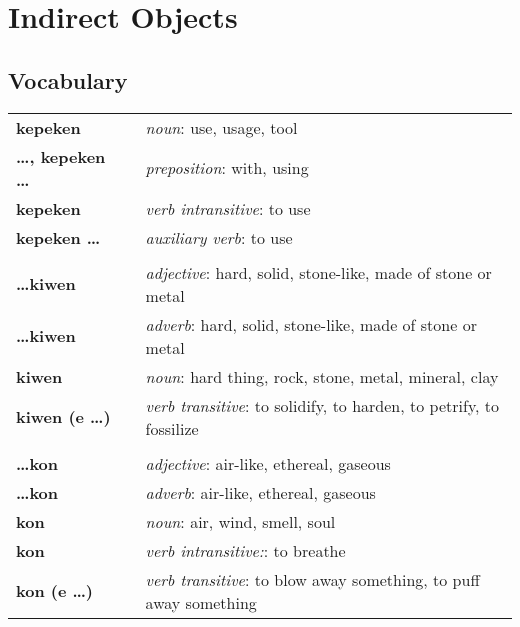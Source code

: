 \section{Indirect Objects}
%
\subsection*{Vocabulary}
\begin{supertabular}{p{2,5cm}|ll}
%
\textbf{kepeken} && \textit{noun}: use, usage, tool \\ %
\textbf{\dots , kepeken \dots} && \textit{preposition}: with, using \\ %
\textbf{kepeken} && \textit{verb intransitive}: to use \\ %
\textbf{kepeken \dots} && \textit{auxiliary verb}: to use \\ %
 && \\ %
%
\textbf{\dots kiwen} && \textit{adjective}: hard, solid, stone-like, made of stone or metal \\ %
\textbf{\dots kiwen} && \textit{adverb}: hard, solid, stone-like, made of stone or metal \\ %
\textbf{kiwen} && \textit{noun}: hard thing, rock, stone, metal, mineral, clay \\ %
\textbf{kiwen (e \dots)} && \textit{verb transitive}: to solidify, to harden, to petrify, to fossilize \\ %
 && \\ %
%
\textbf{\dots kon} && \textit{adjective}: air-like, ethereal, gaseous \\ %
\textbf{\dots kon} && \textit{adverb}: air-like, ethereal, gaseous \\ %
\textbf{kon} && \textit{noun}: air, wind, smell, soul \\ %
\textbf{kon} && \textit{verb intransitive:}: to breathe \\ %
\textbf{kon (e \dots)} && \textit{verb transitive}: to blow away something, to puff away something \\ %

\end{supertabular}
